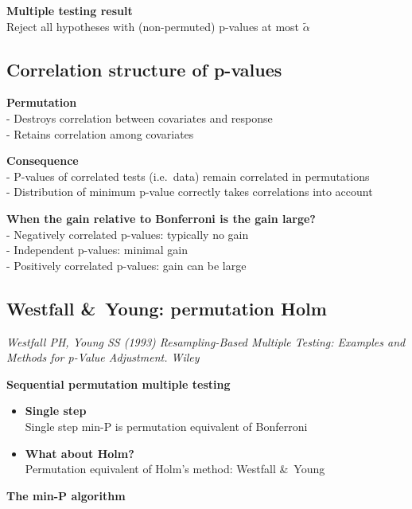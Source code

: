 \documentclass[
]{article}
\providecommand{\tightlist}{%
  \setlength{\itemsep}{0pt}\setlength{\parskip}{0pt}}
\begin{document}
\textbf{Multiple testing result}\\
Reject all hypotheses with (non-permuted) p-values at most
\(\tilde\alpha\)

\hypertarget{correlation-structure-of-p-values}{%
\subsection{Correlation structure of
p-values}\label{correlation-structure-of-p-values}}

\textbf{Permutation}\\
- Destroys correlation between covariates and response\\
- Retains correlation among covariates

\textbf{Consequence}\\
- P-values of correlated tests (i.e.~data) remain correlated in
permutations\\
- Distribution of minimum p-value correctly takes correlations into
account

\textbf{When the gain relative to Bonferroni is the gain large?}\\
- Negatively correlated p-values: typically no gain\\
- Independent p-values: minimal gain\\
- Positively correlated p-values: gain can be large

\hypertarget{westfall-young-permutation-holm}{%
\subsection{Westfall \&~Young: permutation
Holm}\label{westfall-young-permutation-holm}}

\emph{Westfall PH, Young SS (1993) Resampling-Based Multiple Testing:
Examples and Methods for p-Value Adjustment. Wiley}

\textbf{Sequential permutation multiple testing}

\begin{itemize}
\tightlist
\item
  \textbf{Single step}\\
  Single step min-P is permutation equivalent of Bonferroni\\
\item
  \textbf{What about Holm?}\\
  Permutation equivalent of Holm's method: Westfall \&~Young
\end{itemize}

\textbf{The min-P algorithm}
\end{document}
